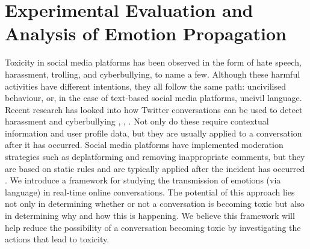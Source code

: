 \documentclass[acmtog]{acmart}
\begin{document}


\section{Experimental Evaluation and Analysis of Emotion Propagation}
Toxicity in social media platforms has been observed in the form of hate speech, harassment, trolling, and cyberbullying, to name a few. Although these harmful activities have different intentions, they all follow the same path: uncivilised behaviour, or, in the case of text-based social media platforms, uncivil language. Recent research has looked into how Twitter conversations can be used to detect harassment and cyberbullying \cite{guberman2016quantifying}, \cite{georgakopoulos2019convolutional}, \cite{pavlopoulos2020toxicity}. Not only do these require contextual information and user profile data, but they are usually applied to a conversation after it has occurred. Social media platforms have implemented moderation strategies such as deplatforming and removing inappropriate comments, but they are based on static rules and are typically applied after the incident has occurred \cite{jhaver2021evaluating}. We introduce a framework for studying the transmission of emotions (via language) in real-time online conversations. The potential of this approach lies not only in determining whether or not a conversation is becoming toxic but also in determining why and how this is happening. We believe this framework will help reduce the possibility of a conversation becoming toxic by investigating the actions that lead to toxicity.
\end{document}
